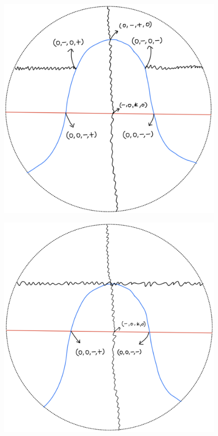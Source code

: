 \begin{definition}
\begin{enumerate}
\begin{itemize}
\begin{figure}[H]
    \centering
    \includegraphics[scale = 0.45]{diagrams/cobord'2/17.png} 
    \caption{}
    \label{fig:your-label}
\end{figure}
\begin{figure}[H]
    \centering
    \includegraphics[scale = 0.45]{diagrams/cobord'2/18.png} 

\end{figure}
\end{itemize}
\end{enumerate}
\end{definition}
